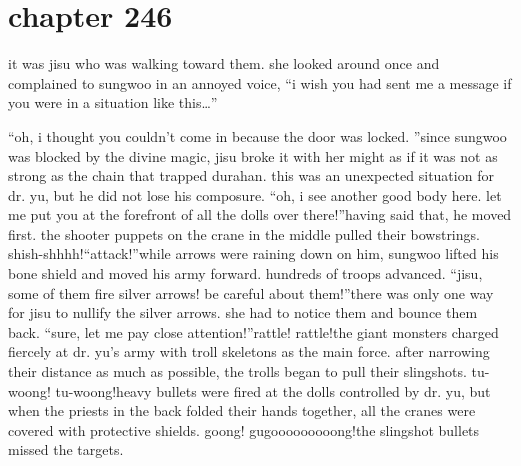 \section{chapter 246}

                            it was jisu who was walking toward them.
 she looked around once and complained to sungwoo in an annoyed voice, “i wish you had sent me a message if you were in a situation like this…”




“oh, i thought you couldn’t come in because the door was locked.
”since sungwoo was blocked by the divine magic, jisu broke it with her might as if it was not as strong as the chain that trapped durahan.
this was an unexpected situation for dr.
 yu, but he did not lose his composure.
“oh, i see another good body here.
 let me put you at the forefront of all the dolls over there!”having said that, he moved first.
 the shooter puppets on the crane in the middle pulled their bowstrings.
shish-shhhh!“attack!”while arrows were raining down on him, sungwoo lifted his bone shield and moved his army forward.
 hundreds of troops advanced.
“jisu, some of them fire silver arrows! be careful about them!”there was only one way for jisu to nullify the silver arrows.
 she had to notice them and bounce them back.
“sure, let me pay close attention!”rattle! rattle!the giant monsters charged fiercely at dr.
 yu’s army with troll skeletons as the main force.
after narrowing their distance as much as possible, the trolls began to pull their slingshots.
tu-woong! tu-woong!heavy bullets were fired at the dolls controlled by dr.
 yu, but when the priests in the back folded their hands together, all the cranes were covered with protective shields.
goong! gugooooooooong!the slingshot bullets missed the targets.

